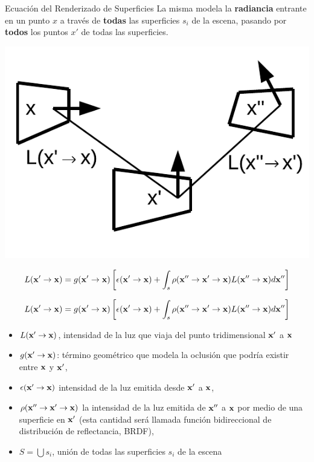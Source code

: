 \documentclass[spanish,unknownkeysallowed]{beamer}
\begin{document}
\begin{frame}{Ecuación del Renderizado de Superficies}
La misma modela la \textbf{radiancia} entrante en un punto $x$ a través de \textbf{todas} las superficies $s_{i}$ de la escena, pasando por \textbf{todos} los puntos $x'$ de todas las superficies.

\centerline{\includegraphics[scale = 0.6]{../figures/rendequation}}
\vspace{-1cm}
$$ L(\bold{x'} \rightarrow \bold{x}) =  g(\bold{x'}  \rightarrow \bold{x})  \left[ \epsilon(\bold{x'}  \rightarrow \bold{x}) + \int_{s}{\rho(\bold{x''}  \rightarrow \bold{x'}  \rightarrow \bold{x})L(\bold{x''}  \rightarrow \bold{x}) d\bold{x''}} \right] $$


\end{frame}

\begin{frame}
$$ L(\bold{x'} \rightarrow \bold{x}) =  g(\bold{x'}  \rightarrow \bold{x})  \left[ \epsilon(\bold{x'}  \rightarrow \bold{x}) + \int_{s}{\rho(\bold{x''}  \rightarrow \bold{x'}  \rightarrow \bold{x})L(\bold{x''}  \rightarrow \bold{x}) d\bold{x''}} \right] $$

\begin{itemize}
\item $L(\bold{x'} \rightarrow \bold{x})$, intensidad de la luz que viaja del punto tridimensional $\bold{x'}$ a $\bold{x}$

\item $g(\bold{x'} \rightarrow \bold{x})$: término geométrico que modela la oclusión que podría existir entre $\bold{x}$ y $\bold{x'}$,
\item $\epsilon(\bold{x'} \rightarrow \bold{x})$ intensidad de la luz emitida desde $\bold{x'}$ a $\bold{x}$,
\item $\rho(\bold{x''}  \rightarrow \bold{x'}  \rightarrow \bold{x})$ la intensidad de la luz emitida de $\bold{x''}$ a $\bold{x}$ por medio de una superficie en $\bold{x'}$ (esta cantidad será llamada función bidireccional de distribución de reflectancia, BRDF),

\item $S=\bigcup{s_{i}}$, unión de todas las superficies $s_{i}$ de la escena
\end{itemize}
\end{frame}
\end{document}
